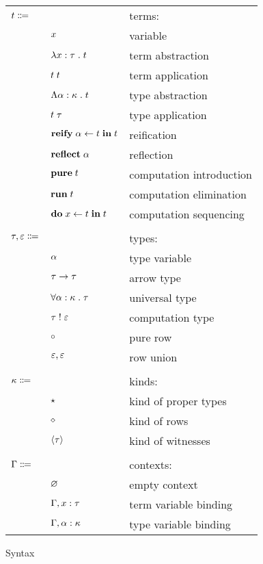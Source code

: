     \begin{figure}[H]
      \begin{center}
        \begin{tabular}{l l l}
          $t \Coloneqq$ & & terms: \\
          & $x$ & variable \\
          & $\lambda x : \tau \; . \; t$ & term abstraction \\
          & $t \; t$ & term application \\
          & $\Lambda \alpha : \kappa \; . \; t$ & type abstraction \\
          & $t \; \tau$ & type application \\
          & $\mathbf{reify} \; \alpha \leftarrow t \; \mathbf{in} \; t$ & reification \\
          & $\mathbf{reflect} \; \alpha$ & reflection \\
          & $\mathbf{pure} \; t$ & computation introduction \\
          & $\mathbf{run} \; t$ & computation elimination \\
          & $\mathbf{do} \; x \leftarrow t \; \mathbf{in} \; t$ & computation sequencing \\
          \\
          $\tau, \varepsilon \Coloneqq$ & & types: \\
          & $\alpha$ & type variable \\
          & $\tau \rightarrow \tau$ & arrow type \\
          & $\forall \alpha : \kappa \; . \; \tau$ & universal type \\
          & $\tau \; ! \; \varepsilon$ & computation type \\
          & $\circ$ & pure row \\
          & $\varepsilon, \varepsilon$ & row union \\
          \\
          $\kappa \Coloneqq$ & & kinds: \\
          & $\star$ & kind of proper types \\
          & $\diamond$ & kind of rows \\
          & $\left\langle \tau \right\rangle$ & kind of witnesses \\
          \\
          $\Gamma \Coloneqq$ & & contexts: \\
          & $\varnothing$ & empty context \\
          & $\Gamma, x : \tau$ & term variable binding \\
          & $\Gamma, \alpha : \kappa$ & type variable binding \\
        \end{tabular}
      \end{center}

      \caption{Syntax}
      \label{fig:syntax}
    \end{figure}

